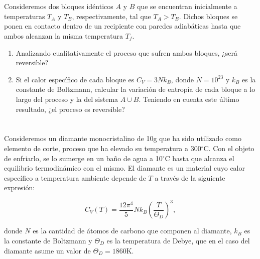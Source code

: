 \documentclass[a4paper,11pt]{article}
\begin{document}
\section{}

Consideremos dos bloques idénticos $A$ y $B$ que se encuentran
inicialmente a temperaturas $T_A$ y $T_B$, respectivamente, tal que
$T_A > T_B$. Dichos bloques se ponen en contacto dentro de un
recipiente con paredes adiabáticas hasta que ambos alcanzan la misma
temperatura $T_f$.

\begin{enumerate}[label=(\alph*),
                  leftmargin=2\parindent,
                  rightmargin=2\parindent]

    \item{Analizando cualitativamente el proceso que sufren ambos
          bloques, ¿será reversible?}

    \item{Si el calor específico de cada bloque es $C_V = 3 N k_B$,
          donde $N = 10^{23}$ y $k_B$ es la constante de Boltzmann,
          calcular la variación de entropía de cada bloque a lo largo
          del proceso y la del sistema $A \cup B$.
          Teniendo en cuenta este último resultado, ¿el proceso es
          reversible?}

\end{enumerate}


\section{}

Consideremos un diamante monocristalino de 10g que ha sido utilizado
como elemento de corte, proceso que ha elevado su temperatura a
300$^\circ$C.
Con el objeto de enfriarlo, se lo sumerge en un baño de agua a
10$^\circ$C hasta que alcanza el equilibrio termodinámico con el mismo.
El diamante es un material cuyo calor específico a temperatura
ambiente depende de $T$ a través de la siguiente expresión:

$$ C_V(T) = \frac{12\pi^4}{5} N k_B \left( \frac{T}{\Theta_D} \right)^3, $$

\noindent donde $N$ es la cantidad de átomos de carbono que componen
al diamante, $k_B$ es la constante de Boltzmann y $\Theta_D$ es la
temperatura de Debye, que en el caso del diamante asume un valor de
$\Theta_D = 1860$K.
\end{document}
